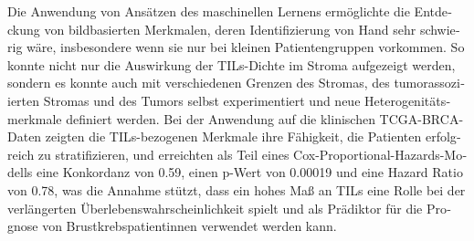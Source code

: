 \begin{otherlanguage}{ngerman}
Die Anwendung von Ansätzen des maschinellen Lernens ermöglichte die Entdeckung von
bildbasierten Merkmalen, deren Identifizierung von Hand sehr schwierig wäre,
insbesondere wenn sie nur bei kleinen Patientengruppen vorkommen. So konnte nicht
nur die Auswirkung der TILs-Dichte im Stroma aufgezeigt werden, sondern es konnte auch
mit verschiedenen Grenzen des Stromas, des tumorassoziierten Stromas und des Tumors
selbst experimentiert und neue Heterogenitätsmerkmale definiert werden.
Bei der Anwendung auf die klinischen TCGA-BRCA-Daten zeigten die TILs-bezogenen Merkmale
ihre Fähigkeit, die Patienten erfolgreich zu stratifizieren, und erreichten als Teil
eines Cox-Proportional-Hazards-Modells eine Konkordanz von 0.59, einen p-Wert von 0.00019 und
eine Hazard Ratio von 0.78, was die Annahme stützt, dass ein hohes Maß an TILs eine Rolle bei der
verlängerten Überlebenswahrscheinlichkeit spielt und als Prädiktor für die
Prognose von Brustkrebspatientinnen verwendet werden kann.

\end{otherlanguage}


\makeatletter
{}
{\renewcommand{\abstractname}{Abstract}}
{\renewcommand{\abstractname}{Kurzfassung}}
\makeatother